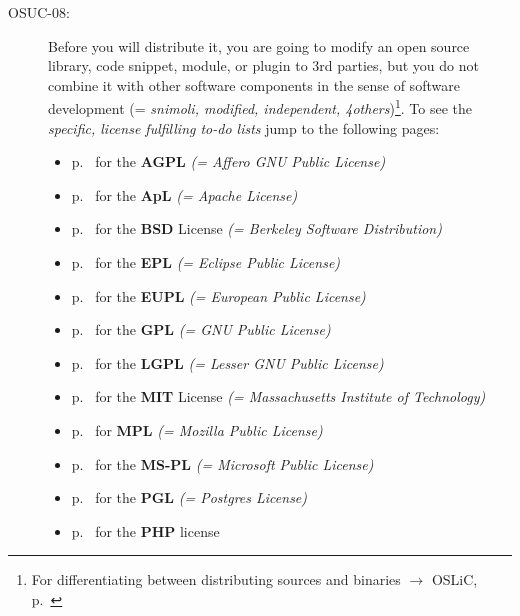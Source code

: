 \begin{description}
\item[OSUC-08:]\label{OSUC-08-DEF} Before you will distribute it, you are going
to modify an open source library, code snippet, module, or plugin to 3rd
parties, but you do not combine it with other software components in the sense
of software development (= \textit{snimoli, modified, independent,
4others})\footnote{For differentiating between distributing sources and binaries
$\rightarrow$ OSLiC, p.\ \pageref{sec:SourceBinaryDifference}}. To see the
\textit{specific, license fulfilling to-do lists} jump to the following pages:
  \begin{itemize}
    \item p.\ \pageref{OSUC-08-AGPL} for the \textbf{AGPL}
      \textit{(= Affero GNU Public License)} 
    \item p.\ \pageref{OSUC-08-Apache20} for the \textbf{ApL}
      \textit{(= Apache License)}
    \item p.\ \pageref{OSUC-08-BSD} for the \textbf{BSD} License
      \textit{(= Berkeley Software Distribution)}
    \item p.\ \pageref{OSUC-08-EPL} for the \textbf{EPL}
      \textit{(= Eclipse Public License)}     
    \item p.\ \pageref{OSUC-08-EUPL} for the \textbf{EUPL}
      \textit{(= European Public License)} 
    \item p.\ \pageref{OSUC-08-GPL} for the \textbf{GPL}
       \textit{(= GNU Public License)} 
    \item p.\ \pageref{OSUC-08-LGPL} for the \textbf{LGPL}
      \textit{(= Lesser GNU Public License)}           
    \item p.\ \pageref{OSUC-08-MIT} for the \textbf{MIT} License
       \textit{(= Massachusetts Institute of Technology)} 
    \item p.\ \pageref{OSUC-08-MPL} for \textbf{MPL}
      \textit{(= Mozilla Public License)}     
    \item p.\ \pageref{OSUC-08-MS-PL} for the \textbf{MS-PL}
      \textit{(= Microsoft Public License)} 
    \item p.\ \pageref{OSUC-08-PGL} for the \textbf{PGL}
      \textit{(= Postgres License)} 
    \item p.\ \pageref{OSUC-08-PHP} for the \textbf{PHP} license 
  \end{itemize}



\end{description}
